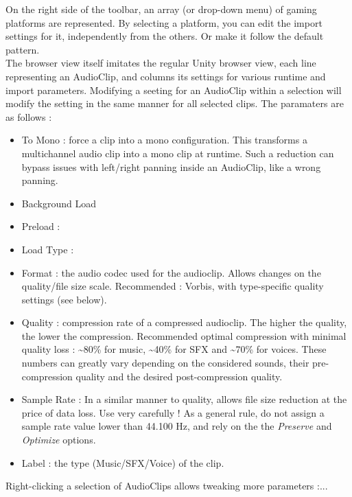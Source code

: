 \documentclass[a4paper,10pt]{article}
\begin{document}
On the right side of the toolbar, an array (or drop-down menu) of gaming platforms are represented. By selecting a platform, you can edit the import settings for it, independently from the others. Or make it follow the default pattern. \\

The browser view itself imitates the regular Unity browser view, each line representing an AudioClip, and columns its settings for various runtime and import parameters. Modifying a seeting for an AudioClip within a selection will modify the setting in the same manner for all selected clips. The paramaters are as follows : 
\begin{itemize}
\item To Mono : force a clip into a mono configuration. This transforms a multichannel audio clip into a mono clip at runtime. Such a reduction can bypass issues with left/right panning inside an AudioClip, like a wrong panning.

\item Background Load

\item Preload :

\item Load Type : 

\item Format : the audio codec used for the audioclip. Allows changes on the quality/file size scale. Recommended : Vorbis, with type-specific quality settings (see below).

\item Quality : compression rate of a compressed audioclip. The higher the quality, the lower the compression. Recommended optimal compression with minimal quality loss : \textasciitilde 80\% for music, \textasciitilde 40\% for SFX and \textasciitilde 70\% for voices. These numbers can greatly vary depending on the considered sounds, their pre-compression quality and the desired post-compression quality.

\item Sample Rate : In a similar manner to quality, allows file size reduction at the price of data loss. Use very carefully ! As a general rule, do not assign a sample rate value lower than 44.100 Hz, and rely on the the \textit{Preserve} and \textit{Optimize} options.

\item Label : the type (Music/SFX/Voice) of the clip.
\end{itemize}

Right-clicking a selection of AudioClips allows tweaking more parameters :...
\end{document}
